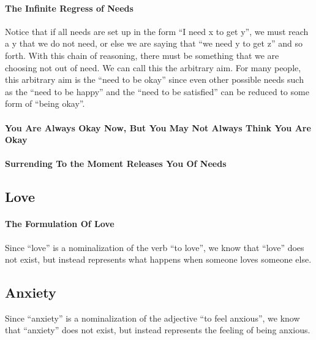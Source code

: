 \documentclass[a4paper, 12pt]{article}
\begin{document}
\paragraph{The Infinite Regress of Needs}
Notice that if all needs are set up in the form ``I need  x to get y'', we must reach a y that we do not need, or else we are saying that ``we need y to get z'' and so forth. With this chain of reasoning, there must be something that we are choosing not out of need. We can call this the arbitrary aim. For many people, this arbitrary aim is the ``need to be okay'' since even other possible needs such as the ``need to be happy'' and the ``need to be satisfied'' can be reduced to some form of ``being okay''. \\
\paragraph{You Are Always Okay Now, But You May Not Always Think You Are Okay}
\paragraph{Surrending To the Moment Releases You Of Needs}

\subsection{Love}
\paragraph{The Formulation Of Love}
Since ``love'' is a nominalization of the verb ``to love'', we know that ``love'' does not exist, but instead represents what happens when someone loves someone else. \\
\subsection{Anxiety}
Since ``anxiety'' is a nominalization of the adjective ``to feel anxious'', we know that ``anxiety'' does not exist, but instead represents the feeling of being anxious. \\
\end{document}
